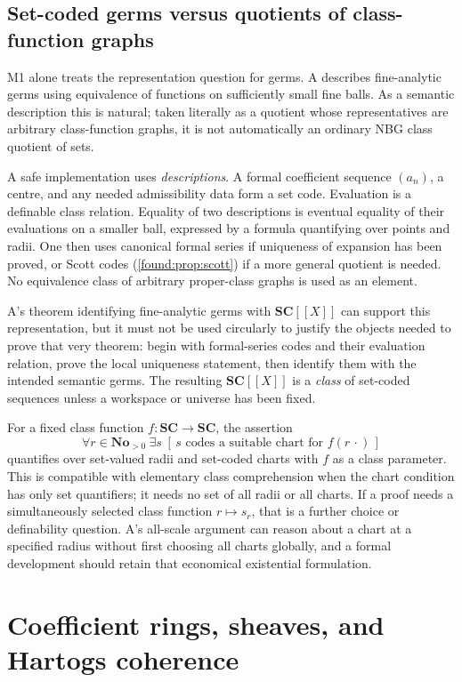 \documentclass[11pt,letterpaper]{article}
\numberwithin{equation}{section}
\theoremstyle{definition}
\theoremstyle{remark}
\newcommand{\No}{\mathbf{No}}
\newcommand{\SC}{\mathbf{SC}}
\begin{document}
\subsection{Set-coded germs versus quotients of class-function graphs}
\label{found:sub:germs}
M1 alone treats the representation question for germs. A describes fine-analytic
germs using equivalence of functions on sufficiently small fine balls. As a
semantic description this is natural; taken literally as a quotient whose
representatives are arbitrary class-function graphs, it is not automatically an
ordinary NBG class quotient of sets.

A safe implementation uses \emph{descriptions}. A formal coefficient sequence
$(a_n)$, a centre, and any needed admissibility data form a set code. Evaluation
is a definable class relation. Equality of two descriptions is eventual equality
of their evaluations on a smaller ball, expressed by a formula quantifying over
points and radii. One then uses canonical formal series if uniqueness of
expansion has been proved, or Scott codes (\cref{found:prop:scott}) if a more
general quotient is needed. No equivalence class of arbitrary proper-class
graphs is used as an element.

A's theorem identifying fine-analytic germs with $\SC[[X]]$ can support this
representation, but it must not be used circularly to justify the objects needed
to prove that very theorem: begin with formal-series codes and their evaluation
relation, prove the local uniqueness statement, then identify them with the
intended semantic germs. The resulting $\SC[[X]]$ is a \emph{class} of set-coded
sequences unless a workspace or universe has been fixed.

For a fixed class function $f:\SC\to\SC$, the assertion
\[
 \forall r\in\No_{>0}\ \exists s\;
 [\,s\text{ codes a suitable chart for }f(r\,\cdot)\,]
\]
quantifies over set-valued radii and set-coded charts with $f$ as a class
parameter. This is compatible with elementary class comprehension when the chart
condition has only set quantifiers; it needs no set of all radii or all charts.
If a proof needs a simultaneously selected class function $r\mapsto s_r$, that is
a further choice or definability question. A's all-scale argument can reason
about a chart at a specified radius without first choosing all charts globally,
and a formal development should retain that economical existential formulation.

\section{Coefficient rings, sheaves, and Hartogs coherence}
\label{found:sec:sheaves}
\end{document}
